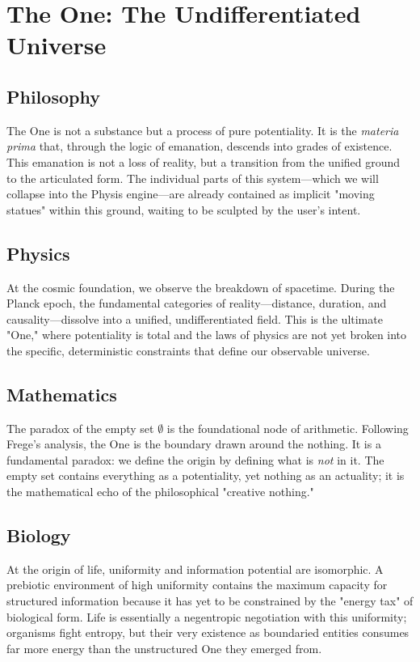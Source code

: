 \section{The One: The Undifferentiated Universe}

\subsection{Philosophy}
The One is not a substance but a process of pure potentiality. It is the \emph{materia prima} that, through the logic of emanation, descends into grades of existence. This emanation is not a loss of reality, but a transition from the unified ground to the articulated form. The individual parts of this system—which we will collapse into the Physis engine—are already contained as implicit "moving statues" within this ground, waiting to be sculpted by the user’s intent.

\subsection{Physics}
At the cosmic foundation, we observe the breakdown of spacetime. During the Planck epoch, the fundamental categories of reality—distance, duration, and causality—dissolve into a unified, undifferentiated field. This is the ultimate "One," where potentiality is total and the laws of physics are not yet broken into the specific, deterministic constraints that define our observable universe.

\subsection{Mathematics}
The paradox of the empty set $\emptyset$ is the foundational node of arithmetic. Following Frege’s analysis, the One is the boundary drawn around the nothing. It is a fundamental paradox: we define the origin by defining what is \textit{not} in it. The empty set contains everything as a potentiality, yet nothing as an actuality; it is the mathematical echo of the philosophical "creative nothing."

\subsection{Biology}
At the origin of life, uniformity and information potential are isomorphic. A prebiotic environment of high uniformity contains the maximum capacity for structured information because it has yet to be constrained by the "energy tax" of biological form. Life is essentially a negentropic negotiation with this uniformity; organisms fight entropy, but their very existence as boundaried entities consumes far more energy than the unstructured One they emerged from.

